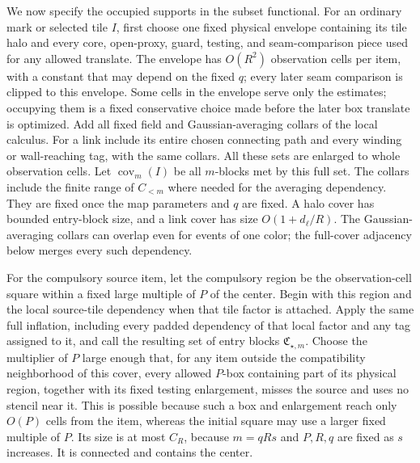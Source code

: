 We now specify the occupied supports in the subset functional.
For an ordinary mark or selected tile \(I\), first choose one fixed
physical envelope containing its tile
halo and every core, open-proxy, guard, testing, and seam-comparison
piece used for any allowed translate.  The envelope has \(O(R^2)\)
observation cells per item, with a constant that may depend on the
fixed \(q\); every later seam comparison is
clipped to this envelope.  Some cells in the envelope serve only the
estimates; occupying them is a fixed conservative choice made before
the later box translate is optimized.  Add all fixed field and Gaussian-averaging
collars of the local calculus.  For a link
include its entire chosen connecting path and every winding or
wall-reaching tag, with the same collars.  All these sets are
enlarged to whole observation cells.  Let
\(\operatorname{cov}_m(I)\) be all \(m\)-blocks met by this full
set.  The collars include the finite range of \(C_{<m}\) where
needed for the averaging dependency.  They are fixed once the
map parameters and \(q\) are fixed.  A halo cover has bounded
entry-block size, and a link cover has size
\(O(1+d_\ell/R)\).
The Gaussian-averaging collars can overlap even for events of one
color; the full-cover adjacency below merges every such dependency.

For the compulsory source item, let the compulsory region be the
observation-cell square within a fixed large multiple of \(P\) of the
center.  Begin with this region and the local source-tile dependency
when that tile factor is attached.
Apply the same full inflation, including every padded dependency
of that local factor and any tag assigned to it, and call the
resulting set of entry blocks
\(\mathfrak C_{\star,m}\).  Choose the multiplier of \(P\) large
enough that, for any item outside the compatibility neighborhood of
this cover, every allowed \(P\)-box containing part of its physical
region, together with its fixed testing enlargement, misses the source
and uses no stencil near it.  This is possible because such a box and
enlargement reach only \(O(P)\) cells from the item, whereas the initial
square may use a larger fixed multiple of \(P\).  Its size is at
most \(C_R\), because \(m=qRs\) and \(P,R,q\) are fixed as
\(s\) increases.  It is connected and contains the center.


